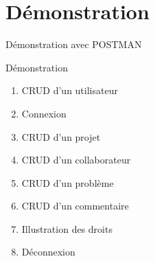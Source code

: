 \section{Démonstration}

\begin{frame}{Démonstration avec POSTMAN}
  \begin{block}{Démonstration}
    \begin{enumerate}
    \item \textsc{CRUD} d'un utilisateur
    \item Connexion
    \item \textsc{CRUD} d'un projet
    \item \textsc{CRUD} d'un collaborateur
    \item \textsc{CRUD} d'un problème
    \item \textsc{CRUD} d'un commentaire
    \item Illustration des droits
    \item Déconnexion
    \end{enumerate}
  \end{block}
\end{frame}
